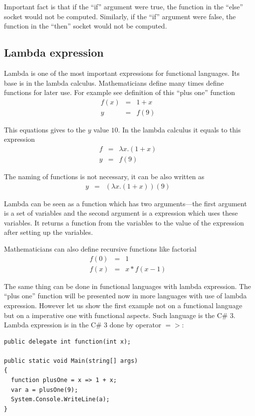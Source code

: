 \documentclass[a4paper,12pt]{book}
\begin{document}
Important fact is that if the ``if'' argument were true, the function in the ``else'' socket would not be computed. Similarly, if the ``if'' argument were false, the function in the ``then'' socket would not be computed.

\subsection{Lambda expression}
Lambda is one of the most important expressions for functional languages. Its base is in the lambda calculus. Mathematicians define many times define functions for later use. For example see definition of this ``plus one'' function
\begin{eqnarray*}
f(x)&=&1 + x\\
y&=&f(9)
\end{eqnarray*}

This equations gives to the $y$ value $10$. In the lambda calculus it equals to this expression
\begin{eqnarray*}
f&=&\lambda x.(1+x)\\
y&=&f(9)
\end{eqnarray*}

The naming of functions is not necessary, it can be also written as 
\begin{eqnarray*}
y&=&(\lambda x.(1+x))(9)
\end{eqnarray*}

Lambda can be seen as a function which has two arguments---the first argument is a set of variables and the second argument is a expression which uses these variables. It returns a function from the variables to the value of the expression after setting up the variables.

Mathematicians can also define recursive functions like factorial
\begin{eqnarray*}
f(0)&=&1\\
f(x)&=&x * f(x - 1)
\end{eqnarray*}

The same thing can be done in functional languages with lambda expression. The ``plus one'' function will be presented now in more languages with use of lambda expression. However let us show the first example not on a functional language but on a imperative one with functional aspects. Such language is the C\# 3. Lambda expression is in the C\# 3 done by operator $=>$:

\begin{verbatim}
public delegate int function(int x);

public static void Main(string[] args)
{
  function plusOne = x => 1 + x;
  var a = plusOne(9);
  System.Console.WriteLine(a);
}
\end{verbatim}
\end{document}
